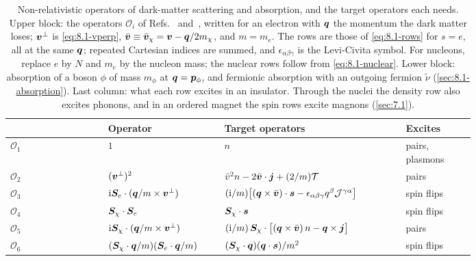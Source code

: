 \begin{table}[tbp]
  \caption{Non-relativistic operators of dark-matter scattering and absorption, and the target operators each needs. Upper block: the operators $\mathcal{O}_i$ of Refs.~\cite[Eqs.~(19)--(24) and (45)]{fitzpatrick2013effective} and~\cite[Eqs.~(12) and (13)]{anand2014model}, written for an electron with $\bm{q}$ the momentum the dark matter loses; $\bm{v}^\perp$ is \cref{eq:8.1-vperp}, $\bar{\bm{v}} \equiv \bar{\bm{v}}_\chi = \bm{v} - \bm{q}/2m_{\chi}$, and $m = m_e$. The rows are those of \cref{eq:8.1-rows} for $s = e$, all at the same $\bm{q}$; repeated Cartesian indices are summed, and $\epsilon_{\alpha\beta\gamma}$ is the Levi-Civita symbol. For nucleons, replace $e$ by $N$ and $m_e$ by the nucleon mass; the nuclear rows follow from \cref{eq:8.1-nuclear}. Lower block: absorption of a boson $\phi$ of mass $m_\phi$ at $\bm{q} = \bm{p}_\phi$, and fermionic absorption with an outgoing fermion $\tilde\nu$ (\cref{sec:8.1-absorption}). Last column: what each row excites in an insulator. Through the nuclei the density row also excites phonons, and in an ordered magnet the spin rows excite magnons (\cref{sec:7.1}).}
  \label{tab:8-operators}
  \centering\small
  \renewcommand{\arraystretch}{1.25}
  \begin{tabular}{@{}l>{\raggedright\arraybackslash}p{0.25\linewidth}>{\raggedright\arraybackslash}p{0.39\linewidth}>{\raggedright\arraybackslash}p{0.15\linewidth}@{}}
    \toprule
    & Operator & Target operators & Excites \\
    \midrule
    $\mathcal{O}_1$ & $1$ & $n$ & pairs, plasmons \\
    $\mathcal{O}_2$ & $(\bm{v}^\perp)^2$ & $\bar v^2 n - 2\bar{\bm{v}}\cdot\bm{j} + (2/m)\mathcal{T}$ & pairs \\
    $\mathcal{O}_3$ & $\mathrm{i}\bm{S}_e\cdot(\bm{q}/m\times\bm{v}^\perp)$ & $(\mathrm{i}/m)\bigl[(\bm{q}\times\bar{\bm{v}})\cdot\bm{s} - \epsilon_{\alpha\beta\gamma}q^\beta\mathcal{J}^{\gamma\alpha}\bigr]$ & spin flips \\
    $\mathcal{O}_4$ & $\bm{S}_\chi\cdot\bm{S}_e$ & $\bm{S}_\chi\cdot\bm{s}$ & spin flips \\
    $\mathcal{O}_5$ & $\mathrm{i}\bm{S}_\chi\cdot(\bm{q}/m\times\bm{v}^\perp)$ & $(\mathrm{i}/m)\,\bm{S}_\chi\cdot\bigl[(\bm{q}\times\bar{\bm{v}})\,n - \bm{q}\times\bm{j}\bigr]$ & pairs \\
    $\mathcal{O}_6$ & $(\bm{S}_\chi\cdot\bm{q}/m)(\bm{S}_e\cdot\bm{q}/m)$ & $(\bm{S}_\chi\cdot\bm{q})(\bm{q}\cdot\bm{s})/m^2$ & spin flips \\

\end{tabular}
\end{table}
